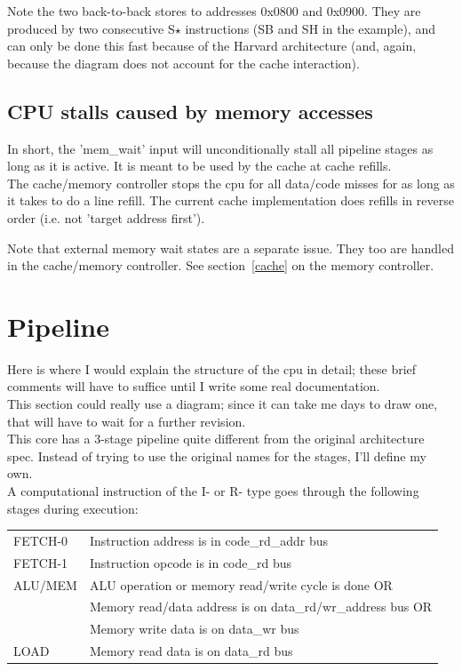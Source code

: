     Note the two back-to-back stores to addresses 0x0800 and 0x0900. They are
    produced by two consecutive S$\star$ instructions (SB and SH in the example),
    and can only be done this fast because of the Harvard architecture (and,
    again, because the diagram does not account for the cache interaction).
    
    
\subsection{CPU stalls caused by memory accesses}
\label{memory_cpu_stalls}

    In short, the 'mem\_wait' input will unconditionally stall all pipeline
    stages as long as it is active. It is meant to be used by the cache at cache 
    refills.\\

    The cache/memory controller stops the cpu for all data/code 
    misses for as long as it takes to do a line refill. The current cache 
    implementation does refills in reverse order (i.e. not 'target address first').

    Note that external memory wait states are a separate issue. They too are 
    handled in the cache/memory controller. See section~\ref{cache} on the memory
    controller.

\section{Pipeline}
\label{pipeline}

    Here is where I would explain the structure of the cpu in detail; these 
    brief comments will have to suffice until I write some real documentation.\\
    
    This section could really use a diagram; since it can take me days to draw 
    one, that will have to wait for a further revision.\\
    
    This core has a 3-stage pipeline quite different from the original 
    architecture spec. Instead of trying to use the original names for the
    stages, I'll define my own.\\
    
    A computational instruction of the I- or R- type goes through the following
    stages during execution:\\

    \begin{tabular}{ l l }
        FETCH-0   & Instruction address is in code\_rd\_addr bus\\
        FETCH-1   & Instruction opcode is in code\_rd bus\\
        ALU/MEM   & ALU operation or memory read/write cycle is done OR\\
                  &   Memory read/data address is on data\_rd/wr\_address bus OR\\
                  &   Memory write data is on data\_wr bus\\
        LOAD      & Memory read data is on data\_rd bus
    \end{tabular}\\        
    
